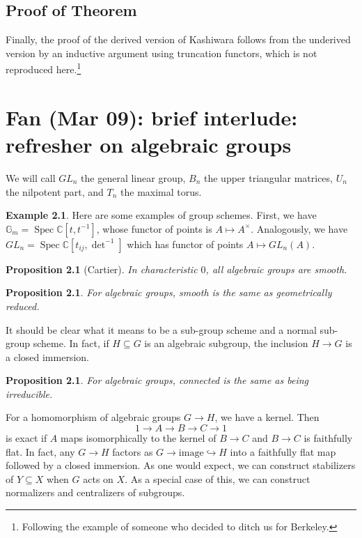 \documentclass[leqno, openany]{memoir}
\newtheorem{prop}[thm]{Proposition}
\theoremstyle{definition}
\newtheorem{exm}[thm]{Example}
\theoremstyle{remark}
\theoremstyle{plain}
\theoremstyle{definition}
\theoremstyle{remark}
\newcommand{\C}{\mathbb{C}}
\DeclareMathOperator{\Spec}{Spec}
\begin{document}
\section{Proof of Theorem}

Finally, the proof of the derived version of Kashiwara follows from the underived version by an inductive argument using truncation functors, which is not reproduced here.\footnote{Following the example of someone who decided to ditch us for Berkeley.}

\chapter{Fan (Mar 09): brief interlude: refresher on algebraic groups}%

We will call $GL_n$ the general linear group, $B_n$ the upper triangular matrices, $U_n$ the nilpotent part, and $T_n$ the maximal torus.

\begin{exm}
    Here are some examples of group schemes. First, we have $\mathbb{G}_m = \Spec \C[t,t^{-1}]$, whose functor of points is $A \mapsto A^{\times}$. Analogously, we have $GL_n = \Spec \C[t_{ij}, \det^{-1}]$ which has functor of points $A \mapsto GL_n(A)$.
\end{exm}

\begin{prop}[Cartier]
    In characteristic $0$, all algebraic groups are smooth.
\end{prop}

\begin{prop}
    For algebraic groups, smooth is the same as geometrically reduced.
\end{prop}

It should be clear what it means to be a sub-group scheme and a normal sub-group scheme. In fact, if $H \subseteq G$ is an algebraic subgroup, the inclusion $H \to G$ is a closed immersion.

\begin{prop}
    For algebraic groups, connected is the same as being irreducible.
\end{prop}

For a homomorphism of algebraic groups $G \to H$, we have a kernel. Then
\[ 1 \to A \to B \to C \to 1 \]
is exact if $A$ maps isomorphically to the kernel of $B \to C$ and $B \to C$ is faithfully flat. In fact, any $G \to H$ factors as $G \to \text{image} \hookrightarrow H$ into a faithfully flat map followed by a closed immersion. As one would expect, we can construct stabilizers of $Y \subseteq X$ when $G$ acts on $X$. As a special case of this, we can construct normalizers and centralizers of subgroups.
\end{document}

